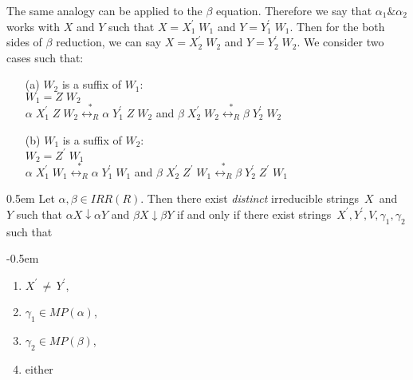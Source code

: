 \documentclass{lmcs} %
\theoremstyle{plain}\newtheorem{satz}[thm]{Satz} %
\begin{document}
\begin{appendices}
{The same analogy can be applied to the $\beta$ equation. Therefore we
say that $\alpha_1 \& \alpha_2$ works with $X$ and $Y$ such that $X=
X^{\prime}_1\;W_1$ and $Y = Y^{\prime}_1\;W_1$. Then for the both
sides of $\beta$ reduction, we can say $X= X^{\prime}_2\;W_2$ and $Y =
Y^{\prime}_2\;W_2$. We consider two cases such that:

\begin{itemize}
\item[(a)] ${W_2}$ is a suffix of ${W_1}$: \\[+5pt]
 \indent \hspace{12pt} ${W_1} = Z\; {W_2}$\\
 \indent \hspace{12pt} ${\alpha}\; X^{\prime}_1\;Z\; W_2 \stackrel{*}{{\longleftrightarrow}_R}  {\alpha} \; Y^{\prime}_1\;Z\;W_2$ and ${\beta}\;X^{\prime}_2\;W_2 \stackrel{*}{{\longleftrightarrow}_R}  {\beta} \;Y^{\prime}_2\; W_2$\\
\item[(b)] ${W_1}$ is a suffix of  ${W_2}$: \\[+5pt]
 \indent \hspace{12pt} ${W_2} = Z^{\prime}\; {W_1}$\\
  \indent \hspace{12pt} ${\alpha}\; X^{\prime}_1\;W_1 \stackrel{*}{{\longleftrightarrow}_R}  {\alpha} \; Y^{\prime}_1\; W_1$ and ${\beta}\;X^{\prime}_2\;Z^{\prime}\;W_1 \stackrel{*}{{\longleftrightarrow}_R}  {\beta}\;Y^{\prime}_2\; Z^{\prime}\;W_1$
\end{itemize}
}



\begin{lem}{\label{CEOneMappingMonadicLemma4}}
\openup 0.5em
  Let $\alpha, \beta \in IRR(R)$. Then there exist \emph{distinct}
  irreducible strings~$X$~and~$Y$ such that $\alpha X \downarrow
  \alpha Y$ and $\beta X \downarrow \beta Y$ if and only if there
  exist strings~$X^{\prime}, Y^{\prime}, V, \gamma_1^{}, \gamma_2^{}$ such that

\openup -0.5em
\begin{enumerate}

\item $X^{\prime} \, \neq \, Y^{\prime}$,

\item $\gamma_1^{} \in MP(\alpha)$,

\item $\gamma_2^{} \in MP(\beta)$,

\item either \begin{itemize}
  

\end{itemize}
\end{enumerate}
\end{lem}
\end{appendices}
\end{document}
